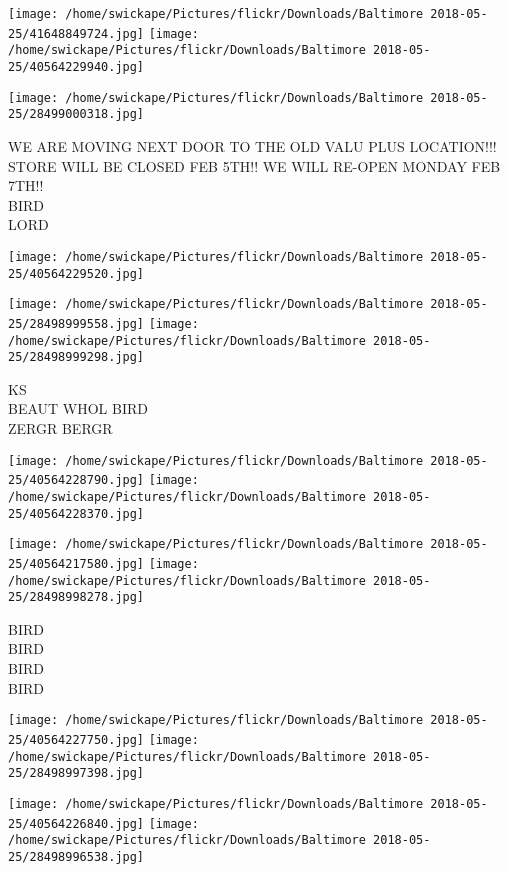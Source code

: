 \documentclass[10pt,letterpaper]{article}
\begin{document}
\texttt{[image: /home/swickape/Pictures/flickr/Downloads/Baltimore 2018-05-25/41648849724.jpg]}
\texttt{[image: /home/swickape/Pictures/flickr/Downloads/Baltimore 2018-05-25/40564229940.jpg]}

\texttt{[image: /home/swickape/Pictures/flickr/Downloads/Baltimore 2018-05-25/28499000318.jpg]}

WE ARE MOVING NEXT DOOR TO THE OLD VALU PLUS LOCATION!!! STORE WILL BE CLOSED FEB 5TH!! WE WILL RE{-}OPEN MONDAY FEB 7TH!!\\
BIRD\\
LORD\\
\pagebreak

\texttt{[image: /home/swickape/Pictures/flickr/Downloads/Baltimore 2018-05-25/40564229520.jpg]}

\vspace{0.25in}
\texttt{[image: /home/swickape/Pictures/flickr/Downloads/Baltimore 2018-05-25/28498999558.jpg]}
\texttt{[image: /home/swickape/Pictures/flickr/Downloads/Baltimore 2018-05-25/28498999298.jpg]}

KS\\
BEAUT WHOL BIRD\\
ZERGR BERGR\\
\pagebreak

\texttt{[image: /home/swickape/Pictures/flickr/Downloads/Baltimore 2018-05-25/40564228790.jpg]}
\texttt{[image: /home/swickape/Pictures/flickr/Downloads/Baltimore 2018-05-25/40564228370.jpg]}

\texttt{[image: /home/swickape/Pictures/flickr/Downloads/Baltimore 2018-05-25/40564217580.jpg]}
\texttt{[image: /home/swickape/Pictures/flickr/Downloads/Baltimore 2018-05-25/28498998278.jpg]}

BIRD\\
BIRD\\
BIRD\\
BIRD\\
\pagebreak

\texttt{[image: /home/swickape/Pictures/flickr/Downloads/Baltimore 2018-05-25/40564227750.jpg]}
\texttt{[image: /home/swickape/Pictures/flickr/Downloads/Baltimore 2018-05-25/28498997398.jpg]}

\texttt{[image: /home/swickape/Pictures/flickr/Downloads/Baltimore 2018-05-25/40564226840.jpg]}
\texttt{[image: /home/swickape/Pictures/flickr/Downloads/Baltimore 2018-05-25/28498996538.jpg]}
\end{document}
